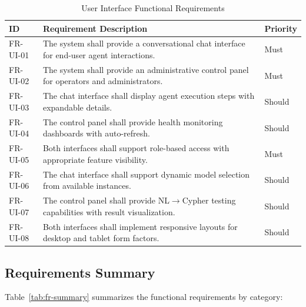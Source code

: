 \begin{table}[htbp]
\centering
\caption{User Interface Functional Requirements}
\label{tab:fr-ui}
\small
\begin{tabularx}{\textwidth}{|l|X|l|}
\hline
\textbf{ID} & \textbf{Requirement Description} & \textbf{Priority} \\
\hline
FR-UI-01 & The system shall provide a conversational chat interface for end-user agent interactions. & Must \\
\hline
FR-UI-02 & The system shall provide an administrative control panel for operators and administrators. & Must \\
\hline
FR-UI-03 & The chat interface shall display agent execution steps with expandable details. & Should \\
\hline
FR-UI-04 & The control panel shall provide health monitoring dashboards with auto-refresh. & Should \\
\hline
FR-UI-05 & Both interfaces shall support role-based access with appropriate feature visibility. & Must \\
\hline
FR-UI-06 & The chat interface shall support dynamic model selection from available instances. & Should \\
\hline
FR-UI-07 & The control panel shall provide NL$\rightarrow$Cypher testing capabilities with result visualization. & Should \\
\hline
FR-UI-08 & Both interfaces shall implement responsive layouts for desktop and tablet form factors. & Should \\
\hline
\end{tabularx}
\end{table}

\subsection{Requirements Summary}
\label{subsec:fr-summary}

Table~\ref{tab:fr-summary} summarizes the functional requirements by category:

